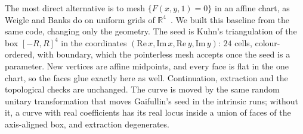 \documentclass[11pt]{article}
\theoremstyle{plain}
\theoremstyle{definition}
\theoremstyle{remark}
\newcommand{\R}{\mathbb{R}}
\begin{document}
The most direct alternative is to mesh $\{F(x,y,1)=0\}$ in an affine
chart, as Weigle and Banks do on uniform grids of
$\R^4$~\cite{weiglebanks1996}. We built this baseline from the same code,
changing only the geometry. The seed is Kuhn's triangulation of the box
$[-R,R]^4$ in the coordinates $(\mathrm{Re}\,x,\mathrm{Im}\,x,\mathrm{Re}\,y,
\mathrm{Im}\,y)$: $24$ cells, colour-ordered, with boundary, which the
pointerless mesh accepts once the seed is a parameter. New vertices are
affine midpoints, and every face is flat in the one chart, so the faces
glue exactly here as well. Continuation, extraction and the topological
checks are unchanged. The curve is moved by the same random unitary
transformation that moves Gaifullin's seed in the intrinsic runs; without
it, a curve with real coefficients has its real locus inside a union of
faces of the axis-aligned box, and extraction degenerates.
\end{document}
